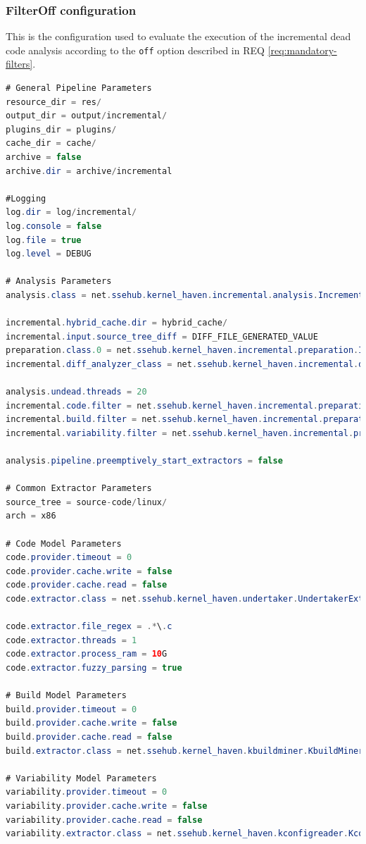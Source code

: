 \documentclass[a4paper]{article}
\begin{document}
\clearpage

\subsubsection{FilterOff configuration}

This is the configuration used to evaluate the execution of the incremental dead code analysis according to the \texttt{off} option described in  REQ \ref{req:mandatory-filters}.

\begin{lstlisting}[language=java]
# General Pipeline Parameters 
resource_dir = res/
output_dir = output/incremental/
plugins_dir = plugins/
cache_dir = cache/
archive = false
archive.dir = archive/incremental

#Logging
log.dir = log/incremental/
log.console = false
log.file = true
log.level = DEBUG

# Analysis Parameters
analysis.class = net.ssehub.kernel_haven.incremental.analysis.IncrementalThreadedDeadCodeAnalysis

incremental.hybrid_cache.dir = hybrid_cache/
incremental.input.source_tree_diff = DIFF_FILE_GENERATED_VALUE
preparation.class.0 = net.ssehub.kernel_haven.incremental.preparation.IncrementalPreparation
incremental.diff_analyzer_class = net.ssehub.kernel_haven.incremental.diff.analyzer.SimpleDiffAnalyzer

analysis.undead.threads = 20
incremental.code.filter = net.ssehub.kernel_haven.incremental.preparation.filter.DefaultFilter
incremental.build.filter = net.ssehub.kernel_haven.incremental.preparation.filter.DefaultFilter
incremental.variability.filter = net.ssehub.kernel_haven.incremental.preparation.filter.DefaultFilter

analysis.pipeline.preemptively_start_extractors = false

# Common Extractor Parameters
source_tree = source-code/linux/
arch = x86

# Code Model Parameters
code.provider.timeout = 0
code.provider.cache.write = false
code.provider.cache.read = false
code.extractor.class = net.ssehub.kernel_haven.undertaker.UndertakerExtractor

code.extractor.file_regex = .*\.c
code.extractor.threads = 1
code.extractor.process_ram = 10G
code.extractor.fuzzy_parsing = true

# Build Model Parameters 
build.provider.timeout = 0
build.provider.cache.write = false
build.provider.cache.read = false
build.extractor.class = net.ssehub.kernel_haven.kbuildminer.KbuildMinerExtractor

# Variability Model Parameters
variability.provider.timeout = 0
variability.provider.cache.write = false
variability.provider.cache.read = false
variability.extractor.class = net.ssehub.kernel_haven.kconfigreader.KconfigReaderExtractor
\end{lstlisting}
\end{document}
